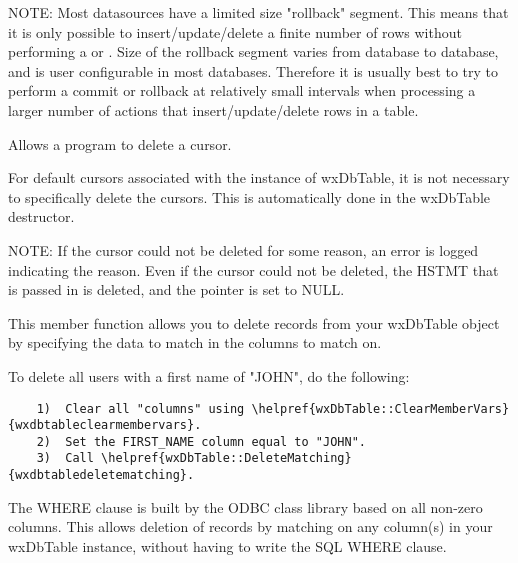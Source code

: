 NOTE: Most datasources have a limited size "rollback" segment.  This means 
that it is only possible to insert/update/delete a finite number of rows 
without performing a  or 
.  Size of the rollback 
segment varies from database to database, and is user configurable in 
most databases.  Therefore it is usually best to try to perform a commit 
or rollback at relatively small intervals when processing a larger number 
of actions that insert/update/delete rows in a table.


\label{wxdbtabledeletecursor}


Allows a program to delete a cursor.




For default cursors associated with the instance of wxDbTable, it is not 
necessary to specifically delete the cursors.  This is automatically done 
in the wxDbTable destructor.

NOTE: If the cursor could not be deleted for some reason, an error is logged 
indicating the reason.  Even if the cursor could not be deleted, the HSTMT 
that is passed in is deleted, and the pointer is set to NULL.


\label{wxdbtabledeletematching}


This member function allows you to delete records from your wxDbTable object 
by specifying the data to match in the columns to match on.  


To delete all users with a first name of "JOHN", do the following:

\begin{verbatim}
    1)  Clear all "columns" using \helpref{wxDbTable::ClearMemberVars}{wxdbtableclearmembervars}.
    2)  Set the FIRST_NAME column equal to "JOHN".
    3)  Call \helpref{wxDbTable::DeleteMatching}{wxdbtabledeletematching}.
\end{verbatim}

The WHERE clause is built by the ODBC class library based on all non-zero 
columns.  This allows deletion of records by matching on any column(s) 
in your wxDbTable instance, without having to write the SQL WHERE clause.

